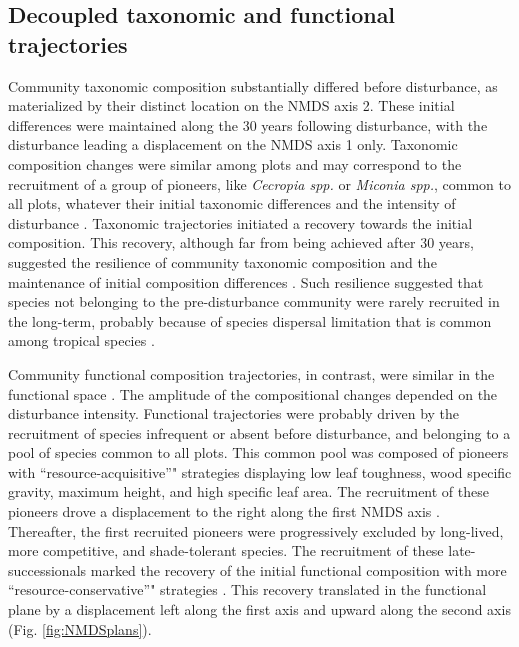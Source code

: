 \documentclass[fleqn,10pt]{ArtEcoFoG} %
\theoremstyle{definition}
\theoremstyle{definition}
\theoremstyle{definition}
\theoremstyle{remark}
\begin{document}
\subsection{Decoupled taxonomic and functional
trajectories}\label{decoupled-taxonomic-and-functional-trajectories}

Community taxonomic composition substantially differed before
disturbance, as materialized by their distinct location on the NMDS axis
2. These initial differences were maintained along the 30 years
following disturbance, with the disturbance leading a displacement on
the NMDS axis 1 only. Taxonomic composition changes were similar among
plots and may correspond to the recruitment of a group of pioneers, like
\emph{Cecropia spp.} or \emph{Miconia spp.}, common to all plots,
whatever their initial taxonomic differences and the intensity of
disturbance \citep{Denslow2000, Bongers2009}. Taxonomic trajectories
initiated a recovery towards the initial composition. This recovery,
although far from being achieved after 30 years, suggested the
resilience of community taxonomic composition and the maintenance of
initial composition differences \citep{Folke2006}. Such resilience
suggested that species not belonging to the pre-disturbance community
were rarely recruited in the long-term, probably because of species
dispersal limitation that is common among tropical species
\citep{Svenning2005}.

Community functional composition trajectories, in contrast, were similar
in the functional space \citep{Fukami2005}. The amplitude of the
compositional changes depended on the disturbance intensity. Functional
trajectories were probably driven by the recruitment of species
infrequent or absent before disturbance, and belonging to a pool of
species common to all plots. This common pool was composed of pioneers
with ``resource-acquisitive''" strategies displaying low leaf toughness,
wood specific gravity, maximum height, and high specific leaf area. The
recruitment of these pioneers drove a displacement to the right along
the first NMDS axis \citep{Westoby1998, Wright2004, Reich2014}.
Thereafter, the first recruited pioneers were progressively excluded by
long-lived, more competitive, and shade-tolerant species. The
recruitment of these late-successionals marked the recovery of the
initial functional composition with more ``resource-conservative''"
strategies . This recovery translated in the functional plane by a
displacement left along the first axis and upward along the second axis
(Fig. \ref{fig:NMDSplans}).
\end{document}
